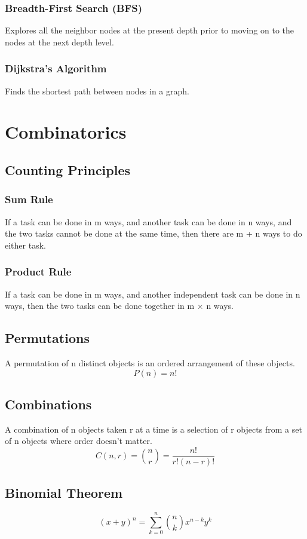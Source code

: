 \documentclass{article}
\begin{document}
\subsubsection{Breadth-First Search (BFS)}
Explores all the neighbor nodes at the present depth prior to moving on to the nodes at the next depth level.

\subsubsection{Dijkstra's Algorithm}
Finds the shortest path between nodes in a graph.

\section{Combinatorics}

\subsection{Counting Principles}

\subsubsection{Sum Rule}
If a task can be done in m ways, and another task can be done in n ways, and the two tasks cannot be done at the same time, then there are m + n ways to do either task.

\subsubsection{Product Rule}
If a task can be done in m ways, and another independent task can be done in n ways, then the two tasks can be done together in m × n ways.

\subsection{Permutations}
A permutation of n distinct objects is an ordered arrangement of these objects.
$$P(n) = n!$$

\subsection{Combinations}
A combination of n objects taken r at a time is a selection of r objects from a set of n objects where order doesn't matter.
$$C(n,r) = \binom{n}{r} = \frac{n!}{r!(n-r)!}$$

\subsection{Binomial Theorem}
$$(x+y)^n = \sum_{k=0}^n \binom{n}{k} x^{n-k} y^k$$
\end{document}
